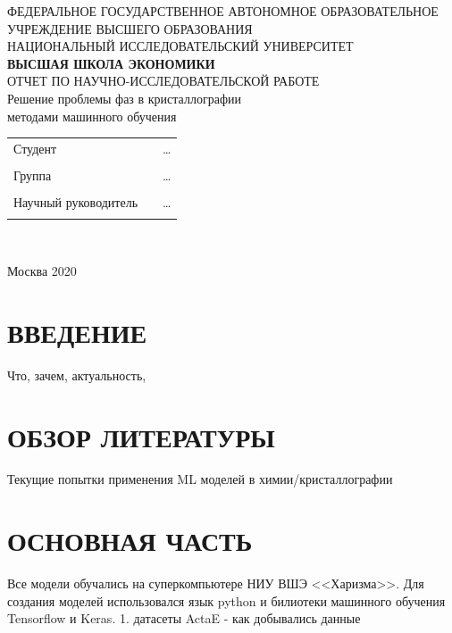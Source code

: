 \documentclass{article}
\begin{document}
\begin{center}

\small{ФЕДЕРАЛЬНОЕ ГОСУДАРСТВЕННОЕ АВТОНОМНОЕ ОБРАЗОВАТЕЛЬНОЕ УЧРЕЖДЕНИЕ ВЫСШЕГО ОБРАЗОВАНИЯ}\\
\footnotesize{НАЦИОНАЛЬНЫЙ ИССЛЕДОВАТЕЛЬСКИЙ УНИВЕРСИТЕТ}\\ 
\small{\textbf{ВЫСШАЯ ШКОЛА ЭКОНОМИКИ}}\\
\hfill \break
\hfill \break
\hfill \break
\hfill \break
\hfill \break
\hfill \break
\hfill \break
\hfill \break
\hfill \break
\large{ОТЧЕТ ПО НАУЧНО-ИССЛЕДОВАТЕЛЬСКОЙ РАБОТЕ}\\
Решение проблемы фаз в кристаллографии \\
методами машинного обучения
\end{center}
\hfill \break
\hfill \break
\hfill \break
\normalsize{
\begin{tabular}{lp{8cm}l}
Студент & & \ldots  \\\\
Группа & & \ldots \\\\
Научный руководитель  &  &\ldots\\\\
\end{tabular}
}\\
\hfill \break

\hfill \break

\hfill \break
\hfill \break
\hfill \break
\hfill \break
\begin{center} Москва 2020 \end{center}
\thispagestyle{empty}
\newpage
\tableofcontents
\newpage
\section{ВВЕДЕНИЕ}
Что, зачем, актуальность, 

\section{ОБЗОР ЛИТЕРАТУРЫ}
Текущие попытки применения ML моделей в химии/кристаллографии

\section{ОСНОВНАЯ ЧАСТЬ}
Все модели обучались на суперкомпьютере НИУ ВШЭ <<Харизма>>. Для создания моделей использовался язык python и билиотеки машинного обучения Tensorflow и Keras.
1. датасеты
ActaE - как добывались данные
\end{document}
